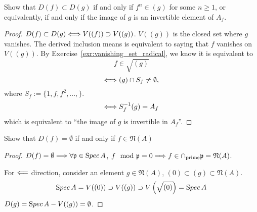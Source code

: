 \documentclass[11pt,fleqn]{book}
\begin{document}
\begin{exr}\label{chap3exr:inclusion_distinguished_open}
Show that $D(f) \subset D(g)$ if and
only if $f^n \in(g)$ for some $n\geq 1$, or equivalently, if and  only if the image of $g$ is an invertible element of $A_f$.
\end{exr}
\begin{proof}
$D(f)\subset D(g)\Longleftrightarrow V((f))\supset V((g))$. $V((g))$ is the closed set where $g$ vanishes. The derived inclusion means is equivalent to saying that $f$ vanishes on $V((g))$. By Exercise~\ref{exr:vanishing_set_radical}, we know it is equivalent to 
$$
f\in \sqrt{(g)}
$$
$$
\Longleftrightarrow (g)\cap S_f\neq \emptyset,
$$
where $S_f:=\{1,f,f^2,...,\}$.
$$
\Longleftrightarrow S_f^{-1}(g)=A_f
$$
which is equivalent to ``the image of $g$ is invertible in $A_f$''.
\end{proof}

\begin{exr}
Show that $D(f) = \emptyset$ if and only if $f\in \mathfrak{N}(A)$
\end{exr}
\begin{proof}
$D(f) = \emptyset\Longrightarrow \forall {\mathfrak p}\in {\text Spec\,} A$, $f\mod{{\mathfrak p}}=0\Longrightarrow f\in \cap_{\text{prime}}{\mathfrak p}=\mathfrak{N}(A)$.

For $\Longleftarrow$ direction, consider an element $g\in \mathfrak{N}(A)$,  $(0)\subset (g)\subset \mathfrak{N}(A)$. 
$$
{\text Spec\,} A=V((0))\supset V((g))\supset V\left(\sqrt{(0)}\right)={\text Spec\,} A
$$
 $D(g)={\text Spec\,} A- V((g))=\emptyset$.
\end{proof}
\end{document}
